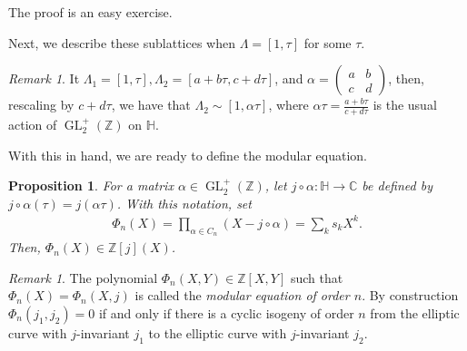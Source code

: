 \documentclass{amsart}
\newtheorem{prop}[thm]{Proposition}
\theoremstyle{definition}
\theoremstyle{remark}
\newtheorem{remark}[thm]{Remark}
\numberwithin{equation}{section}
\newcommand{\bbC}{\mathbb C}
\newcommand{\bbH}{\mathbb H}
\newcommand{\bbZ}{\mathbb Z}
\newcommand{\twobytwo}[4]{\left(\begin{array}{cc} #1 & #2 \\ #3 & #4\end{array} \right)}
\DeclareMathOperator{\GL}{GL}
\begin{document}
The proof is an easy exercise.

Next, we describe these sublattices when $\Lambda = [1, \tau]$ for some $\tau$.

\begin{remark}
It $\Lambda_{1} = [1,\tau], \Lambda_{2} = [a + b \tau, c + d\tau]$, and $\alpha = \twobytwo{a}{b}{c}{d}$, then, rescaling by $c + d\tau$, we have that $\Lambda_{2} \sim [1, \alpha \tau]$, where $\alpha \tau = \frac{a + b\tau}{c + d\tau}$ is the usual action of $\GL_{2}^{+}(\bbZ)$ on $\bbH$.
\end{remark}

With this in hand, we are ready to define the modular equation.

\begin{prop} \label{prop:DefinePhiNXY}
For a matrix $\alpha \in \GL_{2}^{+}(\bbZ)$, let $j \circ \alpha: \bbH \to \bbC$ be defined by $j\circ \alpha(\tau) = j(\alpha \tau)$. With this notation, set
\begin{align} \label{eqn:DefinePhiNX}
\Phi_{n}(X) = \prod_{\alpha \in C_{n}} (X - j \circ \alpha) = \sum_{k} s_{k} X^{k}.
\end{align}
Then, $\Phi_{n}(X) \in \bbZ[j](X)$.
\end{prop}

\begin{remark} \label{rem:DefinePhiNXY}
The polynomial $\Phi_{n}(X,Y) \in \bbZ[X,Y]$ such that $\Phi_{n}(X) = \Phi_{n}(X,j)$ is called the \emph{modular equation of order $n$}. By construction $\Phi_{n}(j_{1}, j_{2}) = 0$ if and only if there is a cyclic isogeny of order $n$ from the elliptic curve with $j$-invariant $j_{1}$ to the elliptic curve with $j$-invariant $j_{2}$.
\end{remark}
\end{document}
